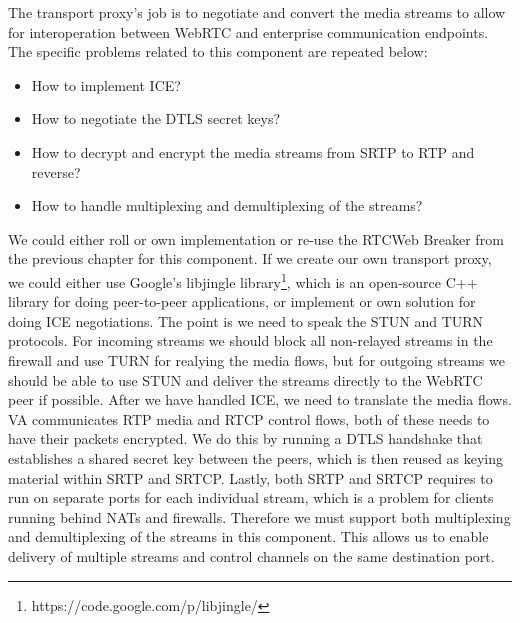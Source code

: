 The transport proxy's job is to negotiate and convert the media streams to allow for interoperation between WebRTC and enterprise communication endpoints. The specific problems related to this component are repeated below:

\begin{itemize}
\item{How to implement ICE?}
\item{How to negotiate the DTLS secret keys?}
\item{How to decrypt and encrypt the media streams from SRTP to RTP and reverse?}
\item{How to handle multiplexing and demultiplexing of the streams?}
\end{itemize}


We could either roll or own implementation or re-use the RTCWeb Breaker from the previous chapter for this component. If we create our own transport proxy, we could either use Google's libjingle library\footnote{https://code.google.com/p/libjingle/}, which is an open-source C++ library for doing peer-to-peer applications, or implement or own solution for doing ICE negotiations. The point is we need to speak the STUN and TURN protocols. For incoming streams we should block all non-relayed streams in the firewall and use TURN for realying the media flows, but for outgoing streams we should be able to use STUN and deliver the streams directly to the WebRTC peer if possible. After we have handled ICE, we need to translate the media flows. VA communicates RTP media and RTCP control flows, both of these needs to have their packets encrypted. We do this by running a DTLS handshake that establishes a shared secret key between the peers, which is then reused as keying material within SRTP and SRTCP. Lastly, both SRTP and SRTCP requires to run on separate ports for each individual stream, which is a problem for clients running behind NATs and firewalls. Therefore we must support both multiplexing and demultiplexing of the streams in this component. This allows us to enable delivery of multiple streams and control channels on the same destination port.

